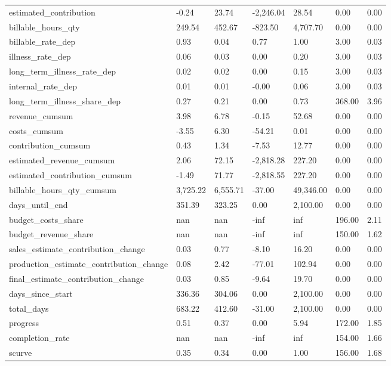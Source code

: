 \begin{landscape}
\begin{longtable}[h!]{lllllll}
estimated_contribution & -0.24 & 23.74 & -2,246.04 & 28.54 & 0.00 & 0.00 \\
billable_hours_qty & 249.54 & 452.67 & -823.50 & 4,707.70 & 0.00 & 0.00 \\
billable_rate_dep & 0.93 & 0.04 & 0.77 & 1.00 & 3.00 & 0.03 \\
illness_rate_dep & 0.06 & 0.03 & 0.00 & 0.20 & 3.00 & 0.03 \\
long_term_illness_rate_dep & 0.02 & 0.02 & 0.00 & 0.15 & 3.00 & 0.03 \\
internal_rate_dep & 0.01 & 0.01 & -0.00 & 0.06 & 3.00 & 0.03 \\
long_term_illness_share_dep & 0.27 & 0.21 & 0.00 & 0.73 & 368.00 & 3.96 \\
revenue_cumsum & 3.98 & 6.78 & -0.15 & 52.68 & 0.00 & 0.00 \\
costs_cumsum & -3.55 & 6.30 & -54.21 & 0.01 & 0.00 & 0.00 \\
contribution_cumsum & 0.43 & 1.34 & -7.53 & 12.77 & 0.00 & 0.00 \\
estimated_revenue_cumsum & 2.06 & 72.15 & -2,818.28 & 227.20 & 0.00 & 0.00 \\
estimated_contribution_cumsum & -1.49 & 71.77 & -2,818.55 & 227.20 & 0.00 & 0.00 \\
billable_hours_qty_cumsum & 3,725.22 & 6,555.71 & -37.00 & 49,346.00 & 0.00 & 0.00 \\
days_until_end & 351.39 & 323.25 & 0.00 & 2,100.00 & 0.00 & 0.00 \\
budget_costs_share & nan & nan & -inf & inf & 196.00 & 2.11 \\
budget_revenue_share & nan & nan & -inf & inf & 150.00 & 1.62 \\
sales_estimate_contribution_change & 0.03 & 0.77 & -8.10 & 16.20 & 0.00 & 0.00 \\
production_estimate_contribution_change & 0.08 & 2.42 & -77.01 & 102.94 & 0.00 & 0.00 \\
final_estimate_contribution_change & 0.03 & 0.85 & -9.64 & 19.70 & 0.00 & 0.00 \\
days_since_start & 336.36 & 304.06 & 0.00 & 2,100.00 & 0.00 & 0.00 \\
total_days & 683.22 & 412.60 & -31.00 & 2,100.00 & 0.00 & 0.00 \\
progress & 0.51 & 0.37 & 0.00 & 5.94 & 172.00 & 1.85 \\
completion_rate & nan & nan & -inf & inf & 154.00 & 1.66 \\
scurve & 0.35 & 0.34 & 0.00 & 1.00 & 156.00 & 1.68 \\

\end{longtable}
\end{landscape}
